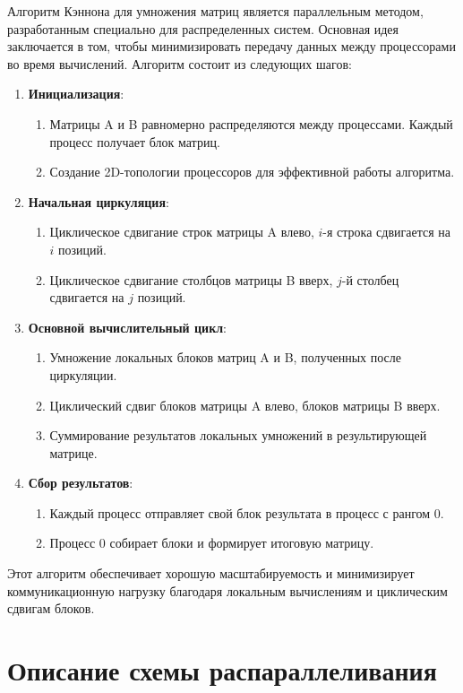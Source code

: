 \documentclass[12pt]{article}
\begin{document}
Алгоритм Кэннона для умножения матриц является параллельным методом, разработанным специально для распределенных систем. Основная идея заключается в том, чтобы минимизировать передачу данных между процессорами во время вычислений. Алгоритм состоит из следующих шагов:
\begin{enumerate}
    \item \textbf{Инициализация}:
    \begin{enumerate}
        \item Матрицы A и B равномерно распределяются между процессами. Каждый процесс получает блок матриц.
        \item Создание 2D-топологии процессоров для эффективной работы алгоритма.
    \end{enumerate}
    \item \textbf{Начальная циркуляция}:
    \begin{enumerate}
        \item Циклическое сдвигание строк матрицы A влево, $i$-я строка сдвигается на $i$ позиций.
        \item Циклическое сдвигание столбцов матрицы B вверх, $j$-й столбец сдвигается на $j$ позиций.
    \end{enumerate}
    \item \textbf{Основной вычислительный цикл}:
    \begin{enumerate}
         \item Умножение локальных блоков матриц A и B, полученных после циркуляции.
         \item  Циклический сдвиг блоков матрицы A влево, блоков матрицы B вверх.
         \item  Суммирование результатов локальных умножений в результирующей матрице.
    \end{enumerate}
     \item \textbf{Сбор результатов}:
     \begin{enumerate}
        \item Каждый процесс отправляет свой блок результата в процесс с рангом 0.
        \item Процесс 0 собирает блоки и формирует итоговую матрицу.
    \end{enumerate}
\end{enumerate}
Этот алгоритм обеспечивает хорошую масштабируемость и минимизирует коммуникационную нагрузку благодаря локальным вычислениям и циклическим сдвигам блоков.

\section{Описание схемы распараллеливания}
\end{document}
